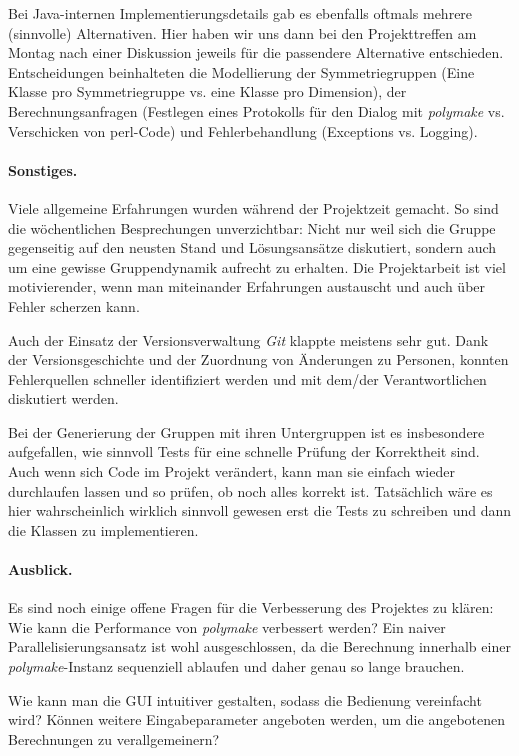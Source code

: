 \noindent Bei Java-internen Implementierungsdetails gab es ebenfalls oftmals mehrere (sinnvolle) Alternativen. Hier haben wir uns dann bei den Projekttreffen am Montag nach einer Diskussion jeweils für die passendere Alternative entschieden. Entscheidungen beinhalteten
die Modellierung der Symmetriegruppen (Eine Klasse pro Symmetriegruppe vs. eine Klasse pro Dimension), der Berechnungsanfragen
(Festlegen eines Protokolls für den Dialog mit \emph{polymake} vs. Verschicken von perl-Code) und
Fehlerbehandlung (Exceptions vs. Logging).

\paragraph{Sonstiges.}
Viele allgemeine Erfahrungen wurden während der Projektzeit gemacht. So sind die wöchentlichen Besprechungen unverzichtbar:
Nicht nur weil sich die Gruppe gegenseitig auf den neusten Stand und Lösungsansätze diskutiert, sondern auch um eine gewisse
Gruppendynamik aufrecht zu erhalten. Die Projektarbeit ist viel motivierender, wenn man miteinander Erfahrungen austauscht
und auch über Fehler scherzen kann.

\noindent Auch der Einsatz der Versionsverwaltung \emph{Git} klappte meistens sehr gut. Dank der Versionsgeschichte und der Zuordnung
von Änderungen zu Personen, konnten Fehlerquellen schneller identifiziert werden und mit dem/der Verantwortlichen diskutiert werden.

\noindent Bei der Generierung der Gruppen mit ihren Untergruppen ist es insbesondere aufgefallen, wie sinnvoll Tests für eine schnelle
Prüfung der Korrektheit sind. Auch wenn sich Code im Projekt verändert, kann man sie einfach wieder durchlaufen lassen und so prüfen,
ob noch alles korrekt ist. Tatsächlich wäre es hier wahrscheinlich wirklich sinnvoll gewesen erst die Tests zu schreiben und dann die
Klassen zu implementieren.

\paragraph{Ausblick.}
Es sind noch einige offene Fragen für die Verbesserung des Projektes zu klären:
Wie kann die Performance von \emph{polymake} verbessert werden? Ein naiver Parallelisierungsansatz ist wohl ausgeschlossen,
da die Berechnung innerhalb einer \emph{polymake}-Instanz sequenziell ablaufen und daher genau so lange brauchen.

\noindent Wie kann man die GUI intuitiver gestalten, sodass die Bedienung vereinfacht wird?
Können weitere Eingabeparameter angeboten werden, um die angebotenen Berechnungen zu verallgemeinern?

